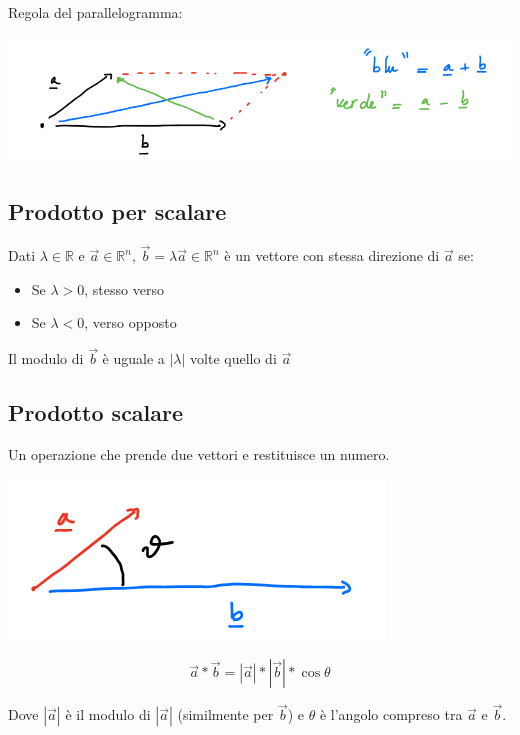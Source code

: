 \documentclass{subfiles}
\begin{document}
Regola del parallelogramma:

\includegraphics[width=\columnwidth]{regola-del-parallelogramma}

\subsection{Prodotto per scalare}

Dati $\lambda \in \mathbb{R}$ e $\vec{a} \in \mathbb{R}^n$, $\vec{b} = \lambda \vec{a} \in \mathbb{R}^n$ è un vettore con stessa direzione di $\vec{a}$ se:

\begin{itemize}
	\item Se $\lambda > 0$, stesso verso
	\item Se $\lambda < 0$, verso opposto
\end{itemize}

\noindent
Il modulo di $\vec{b}$ è uguale a $|\lambda|$ volte quello di $\vec{a}$

\subsection{Prodotto scalare}

Un operazione che prende due vettori e restituisce un numero.

\includegraphics[width=\columnwidth]{prodotto-scalare}

$$
\vec{a} * \vec{b} = |\vec{a}| * |\vec{b}| * \cos{\theta}
$$

\noindent
Dove $|\vec{a}|$ è il modulo di $|\vec{a}|$ (similmente per $\vec{b}$) e $\theta$ è l'angolo compreso tra $\vec{a}$ e $\vec{b}$.
\end{document}
